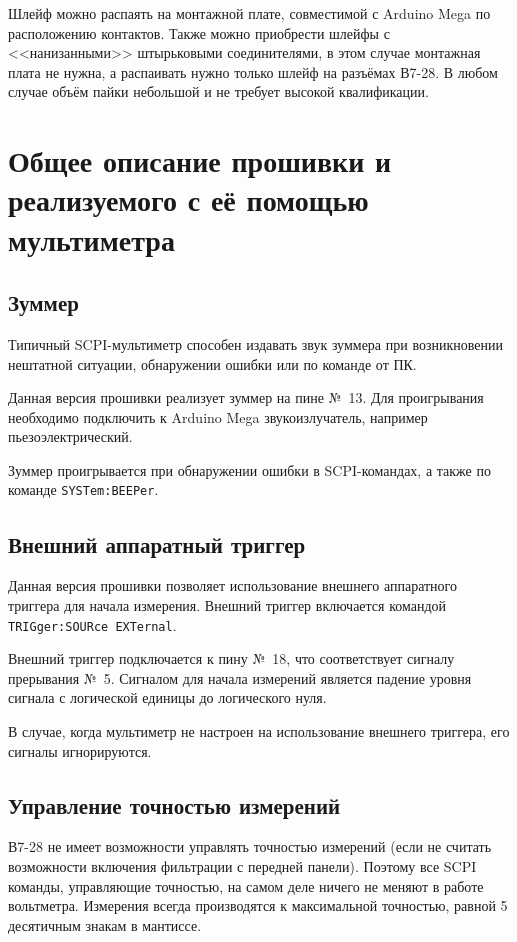 \documentclass[12pt, a4paper]{article}
\newcommand{\V}{\mbox{В7-28}}
\newcommand{\Arduino}{Arduino Mega}
\begin{document}
Шлейф можно распаять на монтажной плате, совместимой с \Arduino{} по расположению контактов. Также можно приобрести шлейфы с <<нанизанными>> штырьковыми соединителями, в этом случае монтажная плата не нужна, а распаивать нужно только шлейф на разъёмах \V{}. В любом случае объём пайки небольшой и не требует высокой квалификации.

\section{Общее описание прошивки и реализуемого с её помощью мультиметра}

\subsection{Зуммер}
\label{sec_zummer}

Типичный SCPI-мультиметр способен издавать звук зуммера при возникновении нештатной ситуации, обнаружении ошибки или по команде от ПК.

Данная версия прошивки реализует зуммер на пине №~13. Для проигрывания необходимо подключить к {\Arduino} звукоизлучатель, например пьезоэлектрический.

Зуммер проигрывается при обнаружении ошибки в SCPI-командах, а также по команде {\tt SYSTem:BEEPer}.

\subsection{Внешний аппаратный триггер}

Данная версия прошивки позволяет использование внешнего аппаратного триггера для начала измерения. Внешний триггер включается командой {\tt TRIGger:SOURce EXTernal}.

Внешний триггер подключается к пину №~18, что соответствует сигналу прерывания №~5. Сигналом для начала измерений является падение уровня сигнала с логической единицы до логического нуля. 

В случае, когда мультиметр не настроен на использование внешнего триггера, его сигналы игнорируются.

\subsection{Управление точностью измерений}
\label{sec_precision}

\V{} не имеет возможности управлять точностью измерений (если не считать возможности включения фильтрации с передней панели). Поэтому все SCPI команды, управляющие точностью, на самом деле ничего не меняют в работе вольтметра. Измерения всегда производятся к максимальной точностью, равной 5 десятичным знакам в мантиссе.
\end{document}
